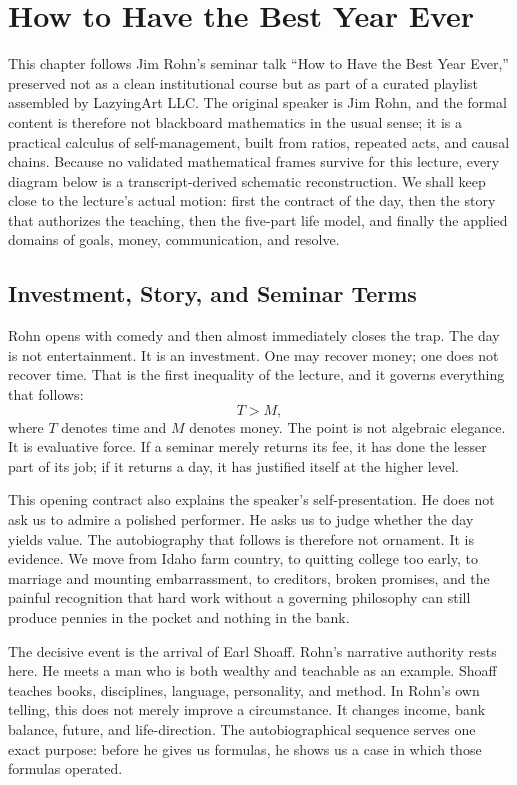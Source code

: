 \chapter{How to Have the Best Year Ever}

This chapter follows Jim Rohn's seminar talk ``How to Have the Best Year Ever,'' preserved not as a clean institutional course but as part of a curated playlist assembled by LazyingArt LLC. The original speaker is Jim Rohn, and the formal content is therefore not blackboard mathematics in the usual sense; it is a practical calculus of self-management, built from ratios, repeated acts, and causal chains. Because no validated mathematical frames survive for this lecture, every diagram below is a transcript-derived schematic reconstruction. We shall keep close to the lecture's actual motion: first the contract of the day, then the story that authorizes the teaching, then the five-part life model, and finally the applied domains of goals, money, communication, and resolve.

\section{Investment, Story, and Seminar Terms}

Rohn opens with comedy and then almost immediately closes the trap. The day is not entertainment. It is an investment. One may recover money; one does not recover time. That is the first inequality of the lecture, and it governs everything that follows:
\begin{equation}
T > M,
\end{equation}
where \(T\) denotes time and \(M\) denotes money. The point is not algebraic elegance. It is evaluative force. If a seminar merely returns its fee, it has done the lesser part of its job; if it returns a day, it has justified itself at the higher level.

This opening contract also explains the speaker's self-presentation. He does not ask us to admire a polished performer. He asks us to judge whether the day yields value. The autobiography that follows is therefore not ornament. It is evidence. We move from Idaho farm country, to quitting college too early, to marriage and mounting embarrassment, to creditors, broken promises, and the painful recognition that hard work without a governing philosophy can still produce pennies in the pocket and nothing in the bank.

The decisive event is the arrival of Earl Shoaff. Rohn's narrative authority rests here. He meets a man who is both wealthy and teachable as an example. Shoaff teaches books, disciplines, language, personality, and method. In Rohn's own telling, this does not merely improve a circumstance. It changes income, bank balance, future, and life-direction. The autobiographical sequence serves one exact purpose: before he gives us formulas, he shows us a case in which those formulas operated.

